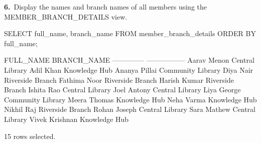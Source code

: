 \noindent\begin{minipage}{\linewidth}
\begingroup{}
{\fontsize{14}{17}\selectfont\textbf{6.}}\ Display the names and branch names of all members using the MEMBER\_BRANCH\_DETAILS view.\par
\endgroup\vspace{12pt}


\begin{sqlcode}
SELECT full_name, branch_name
FROM member_branch_details
ORDER BY full_name;
\end{sqlcode}

\vspace{18pt}


\begin{sqlout}[fontsize=\small]
FULL_NAME       BRANCH_NAME      
--------------  -----------------
Aarav Menon     Central Library
Adil Khan       Knowledge Hub
Ananya Pillai   Community Library
Diya Nair       Riverside Branch
Fathima Noor    Riverside Branch
Harish Kumar    Riverside Branch
Ishita Rao      Central Library
Joel Antony     Central Library
Liya George     Community Library
Meera Thomas    Knowledge Hub
Neha Varma      Knowledge Hub
Nikhil Raj      Riverside Branch
Rohan Joseph    Central Library
Sara Mathew     Central Library
Vivek Krishnan  Knowledge Hub

15 rows selected.
\end{sqlout}
\end{minipage}\par\vspace{24pt}

